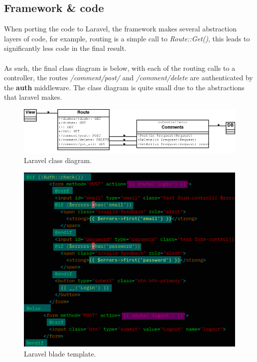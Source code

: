 \documentclass[a4paper]{scrartcl}
\begin{document}
\subsection{Framework \& code}
When porting the code to Laravel, the framework makes several abstraction layers of code,
for example, routing is a simple call to \textit{Route::Get()}, this leads to significantly less
code in the final result.
\\\\
\noindent
As such, the final class diagram is below, with each of the routing calls to a controller,
the routes \textit{/comment/post/} and \textit{/comment/delete} are authenticated by the
\textbf{auth} middleware. The class diagram is quite small due to the abstractions that laravel makes.

\begin{figure}[H]
  \begin{center}
    \includegraphics[scale=0.5]{images/class.png}
    \caption{Laravel class diagram.}
    \label{fig:class_diagram}
  \end{center}
\end{figure}

\begin{figure}[H]
  \begin{center}
    \includegraphics[scale=1.0]{images/blade.png}
    \caption{Laravel blade template.}
    \label{fig:blade}
  \end{center}
\end{figure}
\end{document}
